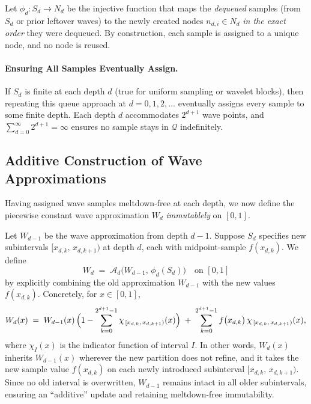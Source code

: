 \begin{definition}
  \label{def:phi-d}
  Let $\phi_d\colon S_d \to N_d$ be the injective function that maps the
  \emph{dequeued} samples (from $S_d$ or prior leftover waves) to the newly
  created nodes $n_{d,i}\in N_d$ \emph{in the exact order} they were dequeued.
  By construction, each sample is assigned to a unique node, and no node is reused.
\end{definition}

\paragraph{Ensuring All Samples Eventually Assign.}
If $S_d$ is finite at each depth $d$ (true for uniform sampling or wavelet blocks),
then repeating this queue approach at $d=0,1,2,\dots$ eventually assigns every sample
to some finite depth. Each depth $d$ accommodates $2^{d+1}$ wave points, and
$\sum_{d=0}^{\infty} 2^{d+1} = \infty$ ensures no sample stays in $\mathcal{Q}$
indefinitely.

\subsection{Additive Construction of Wave Approximations}
\label{subsec:wave-additive}

Having assigned wave samples meltdown-free at each depth, we now define the piecewise
constant wave approximation $W_d$ \emph{immutablely} on $[0,1]$.

\begin{definition}
  Let $W_{d-1}$ be the wave approximation from depth $d{-}1$. Suppose $S_d$
  specifies new subintervals $[x_{d,k},\,x_{d,k+1})$ at depth $d$, each with
  midpoint-sample $f(x_{d,k})$. We define
  \[
    W_d \;=\; \mathcal{A}_d\bigl(W_{d-1},\,\phi_d(S_d)\bigr)\quad \text{on }[0,1]
  \]
  by explicitly combining the old approximation $W_{d-1}$ with the new values
  $f(x_{d,k})$. Concretely, for $x \in [0,1]$,
  \[
    W_d(x)
    \;=\;
    W_{d-1}(x)\,\Bigl(1 - \sum_{k=0}^{2^{d+1}-1}\chi_{\,[x_{d,k},\,x_{d,k+1})}(x)\Bigr)
    \;+\;
    \sum_{k=0}^{2^{d+1}-1} f\bigl(x_{d,k}\bigr)\,\chi_{\,[x_{d,k},\,x_{d,k+1})}(x),
  \]
  where $\chi_{I}(x)$ is the indicator function of interval $I$. In other words,
  $W_d(x)$ inherits $W_{d-1}(x)$ wherever the new partition does not refine,
  and it takes the new sample value $f(x_{d,k})$ on each newly introduced
  subinterval $[x_{d,k},\,x_{d,k+1})$. Since no old interval is overwritten,
  $W_{d-1}$ remains intact in all older subintervals, ensuring an ``additive''
  update and retaining meltdown-free immutability.
\end{definition}

